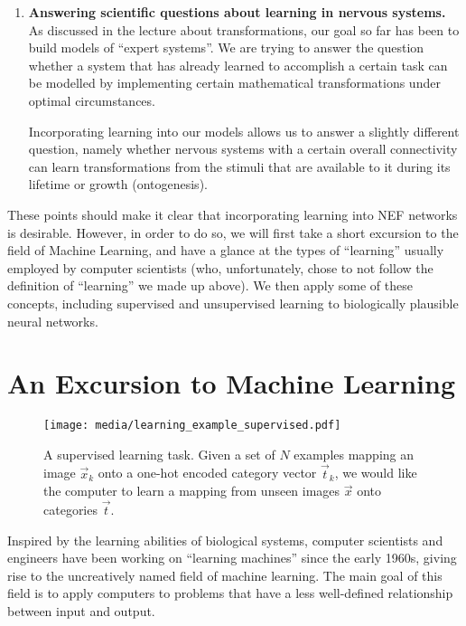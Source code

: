 \documentclass[10pt,letterpaper,oneside]{article}
\begin{document}
\begin{enumerate}[1.]
	\item \textbf{Answering scientific questions about learning in nervous systems.}\\
	As discussed in the lecture about transformations, our goal so far has been to build models of \enquote{expert systems}. We are trying to answer the question whether a system that has already learned to accomplish a certain task can be modelled by implementing certain mathematical transformations under optimal circumstances.

	Incorporating learning into our models allows us to answer a slightly different question, namely whether nervous systems with a certain overall connectivity can learn transformations from the stimuli that are available to it during its lifetime or growth (ontogenesis).
\end{enumerate}

These points should make it clear that incorporating learning into NEF networks is desirable. However, in order to do so, we will first take a short excursion to the field of Machine Learning, and have a glance at the types of \enquote{learning} usually employed by computer scientists (who, unfortunately, chose to not follow the definition of \enquote{learning} we made up above). We then apply some of these concepts, including supervised and unsupervised learning to biologically plausible neural networks.

\section{An Excursion to Machine Learning}

\begin{figure}
	\centering
	\texttt{[image: media/learning\_example\_supervised.pdf]}
	\caption{A supervised learning task. Given a set of $N$ examples mapping an image $\vec x_k$ onto a one-hot encoded category vector $\vec t_k$, we would like the computer to learn a mapping from unseen images $\vec x$ onto categories $\vec t$.}
	\label{fig:learning_example_supervised}
\end{figure}


Inspired by the learning abilities of biological systems, computer scientists and engineers have been working on \enquote{learning machines} since the early 1960s, giving rise to the uncreatively named field of machine learning. The main goal of this field is to apply computers to problems that have a less well-defined relationship between input and output.
\end{document}
